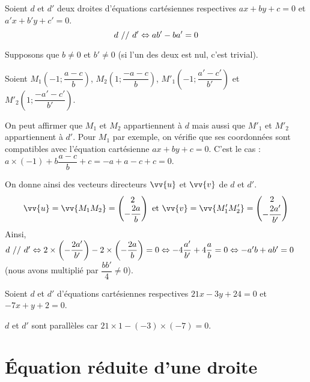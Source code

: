 \documentclass[cours,couleur]{mathsRC}
\begin{document}
\begin{theoreme}
Soient $d$ et $d'$ deux droites d'équations cartésiennes respectives $ax+by+c=0$ et $a'x+b'y+c'=0$.
\[
d\ //\ d' \Leftrightarrow ab'-ba'=0
\]
\end{theoreme}

\begin{demonstration} Supposons que $b\neq 0$ et $b'\neq 0$ (si l'un des deux est nul, c'est trivial).

\bigskip
Soient $M_{1}\left(-1;\dfrac{a-c}{b}\right)$, $M_{2}\left(1;\dfrac{-a-c}{b}\right)$, $M'_{1}\left(-1;\dfrac{a'-c'}{b'}\right)$ et $M'_{2}\left(1;\dfrac{-a'-c'}{b'}\right)$.

\bigskip
On peut affirmer que $M_{1}$ et $M_{2}$ appartiennent à $d$ mais aussi que $M'_{1}$ et $M'_{2}$ appartiennent à $d'$. Pour $M_{1}$ par exemple, on vérifie que ses coordonnées sont compatibles avec l'équation cartésienne $ax+by+c=0$. C'est le cas : $a\times(-1)+b\dfrac{a-c}{b}+c=-a+a-c+c=0$.

On donne ainsi des vecteurs directeurs $\vv{u}$ et $\vv{v}$ de $d$ et $d'$.
\[
\vv{u}=\vv{M_{1}M_{2}}=\coorddeux{2}{-\dfrac{2a}{b}}\text{ et }\vv{v}=\vv{M'_{1}M'_{2}}=\coorddeux{2}{-\dfrac{2a'}{b'}}
\]
Ainsi, $d\ //\ d' \Leftrightarrow 2\times \left( -\dfrac{2a'}{b'}\right)- 2\times \left(-\dfrac{2a}{b}\right)=0 \Leftrightarrow -4\dfrac{a'}{b'}+4\dfrac{a}{b}=0 \Leftrightarrow -a'b+ab'=0$ (nous avons multiplié par $\dfrac{bb'}{4}\neq 0$).
\end{demonstration}

\begin{exemple}
Soient $d$ et $d'$ d'équations cartésiennes respectives $21x-3y+24=0$ et $-7x+y+2=0$.

$d$ et $d'$ sont parallèles car $21\times 1 - (-3)\times (-7)=0$.
\end{exemple}

\section{Équation réduite d'une droite}
\end{document}
